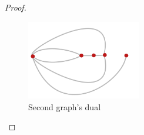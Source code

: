 \begin{proof}
    \begin{figure}[H]
        \begin{center}
        \includegraphics[width=5cm]{Test2/Problem10/Figure1_28_dual.png}
        \end{center}                            
        \caption{Second graph's dual}
        \label{t2:p9_Figure1_28_dual.png}                        
    \end{figure}\pn    
\end{proof}